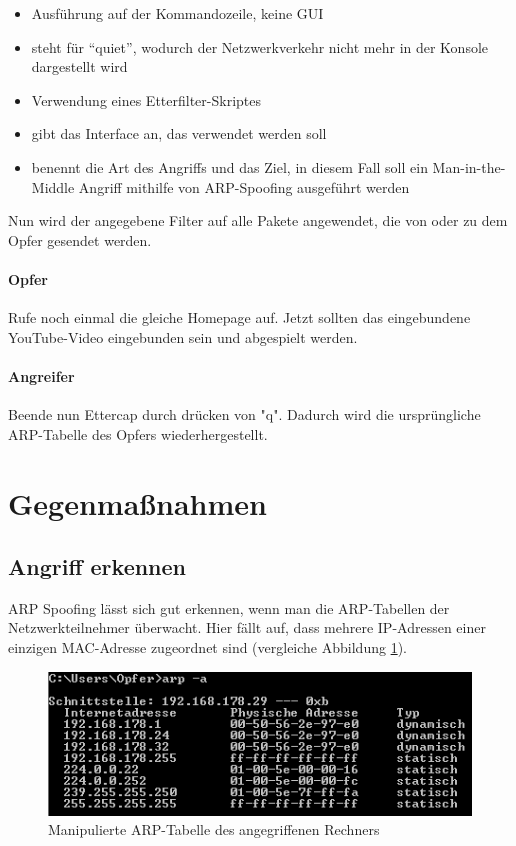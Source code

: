 \begin{itemize}
	\item {} Ausführung auf der Kommandozeile, keine GUI
	\item {} steht für \enquote{quiet}, wodurch der Netzwerkverkehr nicht mehr in der Konsole dargestellt wird
	\item {} Verwendung eines Etterfilter-Skriptes
	\item {} gibt das Interface an, das verwendet werden soll
	\item {} benennt die Art des Angriffs und das Ziel, in diesem Fall soll ein Man-in-the-Middle Angriff mithilfe von ARP-Spoofing ausgeführt werden
\end{itemize}

Nun wird der angegebene Filter auf alle Pakete angewendet, die von oder zu dem Opfer gesendet werden.

\paragraph{Opfer} Rufe noch einmal die gleiche Homepage auf. Jetzt sollten das eingebundene YouTube-Video eingebunden sein und abgespielt werden.

\paragraph{Angreifer} Beende nun Ettercap durch drücken von "q". Dadurch wird die ursprüngliche ARP-Tabelle des Opfers wiederhergestellt.

\section{Gegenmaßnahmen}

\subsection{Angriff erkennen}
ARP Spoofing lässt sich gut erkennen, wenn man die ARP-Tabellen der Netzwerkteilnehmer überwacht. Hier fällt auf, dass mehrere IP-Adressen einer einzigen MAC-Adresse zugeordnet sind (vergleiche Abbildung \ref{fig:arp_tabelle_nachher}).

\begin{figure}
	\centering
	\includegraphics[width=\textwidth]{images/ARP_Spoofing/ARP_Tabelle_Nachher}
	\caption{Manipulierte ARP-Tabelle des angegriffenen Rechners}
	\label{fig:arp_tabelle_nachher}
\end{figure}

